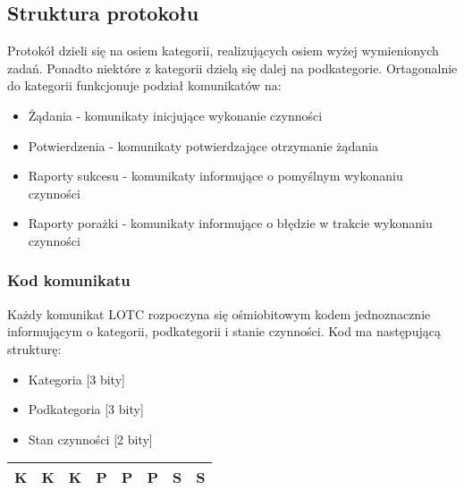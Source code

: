 \documentclass[10pt,a4paper]{article}
\begin{document}
	    \subsection{Struktura protokołu}
	        Protokół dzieli się na osiem kategorii, realizujących osiem wyżej wymienionych zadań. Ponadto niektóre z kategorii dzielą się dalej na podkategorie. Ortagonalnie do kategorii funkcjonuje podział komunikatów na:
	        \begin{itemize}   
				\item Żądania - komunikaty inicjujące wykonanie czynności
				\item Potwierdzenia - komunikaty potwierdzające otrzymanie żądania
			    \item Raporty sukcesu - komunikaty informujące o pomyślnym wykonaniu czynności
				\item Raporty porażki - komunikaty informujące o błędzie w trakcie wykonaniu czynności
	        \end{itemize}
	        
	        \subsubsection{Kod komunikatu}
		        Każdy komunikat LOTC rozpoczyna się ośmiobitowym kodem jednoznacznie informującym o kategorii, podkategorii i stanie czynności. Kod ma następującą strukturę:
		         \begin{itemize}   
					\item Kategoria [3 bity]
					\item Podkategoria [3 bity]
				    \item Stan czynności [2 bity]
		        \end{itemize}
		        
		        \begin{center}
			        \begin{tabular}{ || c | c | c || c | c | c || c | c || }
			            \hline
					    K & K & K & P & P & P & S & S \\
					    \hline
					\end{tabular}  
		        \end{center}
		        
\end{document}
